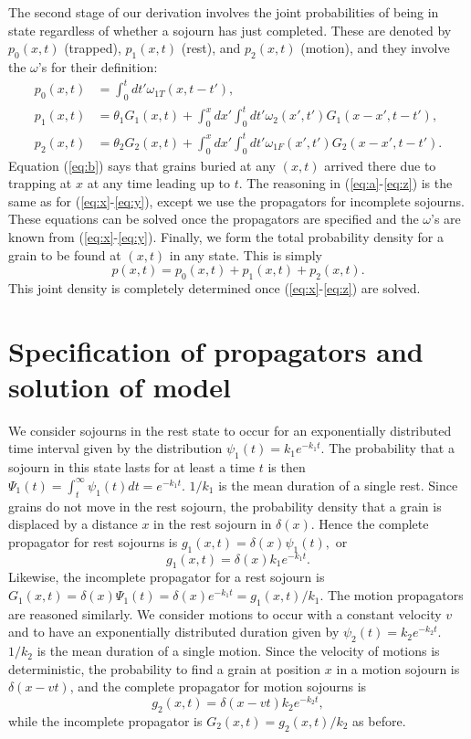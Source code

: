 \documentclass[]{agujournal2018}
\newcommand\be{\begin{equation}}
\newcommand\ee{\end{equation}}
\begin{document}
The second stage of our derivation involves the joint probabilities of being in state regardless of whether a sojourn has just completed. These are denoted by  $p_0(x,t)$ (trapped), $p_1(x,t)$ (rest), and $p_2(x,t)$ (motion), and they involve the $\omega$'s for their definition:
\begin{align}
p_0(x,t) &= \int_0^t dt' \omega_{1T}(x,t-t'), \label{eq:b}\\
p_1(x,t) &= \theta_1 G_1(x,t) + \int_0^x dx' \int_0^t dt' \omega_2(x',t')G_1(x-x',t-t'),\label{eq:a}\\
p_2(x,t) &= \theta_2 G_2(x,t) + \int_0^x dx' \int_0^t dt'  \omega_{1F}(x',t')G_2(x-x',t-t').\label{eq:z}
\end{align}
Equation (\ref{eq:b}) says that grains buried at any $(x,t)$ arrived there due to trapping at $x$ at any time leading up to $t$.
The reasoning in (\ref{eq:a}-\ref{eq:z}) is the same as for (\ref{eq:x}-\ref{eq:y}), except we use the propagators for incomplete sojourns.
These equations can be solved once the propagators are specified and the $\omega$'s are known from (\ref{eq:x}-\ref{eq:y}).
Finally, we form the total probability density for a grain to be found at $(x,t)$ in any state.
This is simply 
\be p(x,t) = p_0(x,t) + p_1(x,t) + p_2(x,t). \label{eq:dist}\ee
This joint density is completely determined once (\ref{eq:x}-\ref{eq:z}) are solved.


\section{Specification of propagators and solution of model}
\label{sec:solution}
We consider sojourns in the rest state to occur for an exponentially distributed time interval given by the distribution $\psi_1(t) = k_1 e^{-k_1t}.$
The probability that a sojourn in this state lasts for at least a time $t$ is then $\Psi_1(t) = \int_t^\infty \psi_1(t)dt = e^{-k_1 t}$.
$1/k_1$ is the mean duration of a single rest.
Since grains do not move in the rest sojourn, the probability density that a grain is displaced by a distance $x$ in the rest sojourn in $\delta(x)$.
Hence the complete propagator for rest sojourns is $g_1(x,t) = \delta(x)\psi_1(t),$ or 
\be g_1(x,t) = \delta(x)k_1e^{-k_1t}.\label{eq:prop1} \ee
Likewise, the incomplete propagator for a rest sojourn is $G_1(x,t) = \delta(x)\Psi_1(t) = \delta(x)e^{-k_1t} = g_1(x,t)/k_1.$
The motion propagators are reasoned similarly.
We consider motions to occur with a constant velocity $v$ and to have an exponentially distributed duration given by $\psi_2(t) = k_2 e^{-k_2t}.$
$1/k_2$ is the mean duration of a single motion.
Since the velocity of motions is deterministic, the probability to find a grain at position $x$ in a motion sojourn is $\delta(x-vt)$, and the complete propagator for motion sojourns is 
\be g_2(x,t) = \delta(x-vt)k_2e^{-k_2t},\label{eq:prop2}\ee
while the incomplete propagator is $G_2(x,t) = g_2(x,t)/k_2$ as before.
\end{document}
